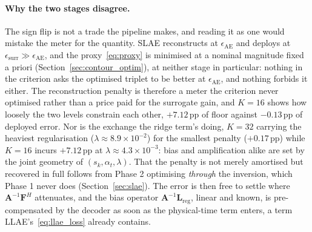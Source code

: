 ﻿\documentclass[a4paper,12pt]{article}
\theoremstyle{definition}
\theoremstyle{remark}
\begin{document}
\paragraph{Why the two stages disagree.}
The sign flip is not a trade the pipeline makes, and reading it as one would mistake the meter for the quantity. SLAE reconstructs at $\epsilon_{\mathrm{AE}}$ and deploys at $\epsilon_{\mathrm{surr}} \gg \epsilon_{\mathrm{AE}}$, and the proxy~\eqref{eq:proxy} is minimised at a nominal magnitude fixed a priori (Section~\ref{sec:contour_optim}), at neither stage in particular: nothing in the criterion asks the optimised triplet to be better at $\epsilon_{\mathrm{AE}}$, and nothing forbids it either. The reconstruction penalty is therefore a meter the criterion never optimised rather than a price paid for the surrogate gain, and $K = 16$ shows how loosely the two levels constrain each other, $+7.12$\,pp of floor against $-0.13$\,pp of deployed error. Nor is the exchange the ridge term's doing, $K=32$ carrying the heaviest regularisation ($\lambda \approx 8.9\times10^{-2}$) for the smallest penalty ($+0.17$\,pp) while $K=16$ incurs $+7.12$\,pp at $\lambda \approx 4.3\times10^{-3}$: bias and amplification alike are set by the joint geometry of $(s_k, \alpha_t, \lambda)$. That the penalty is not merely amortised but recovered in full follows from Phase 2 optimising \emph{through} the inversion, which Phase 1 never does (Section~\ref{sec:slae}). The error is then free to settle where $\bm{A}^{-1}\bm{F}^H$ attenuates, and the bias operator $\bm{A}^{-1}\bm{L}_{\mathrm{reg}}$, linear and known, is pre-compensated by the decoder as soon as the physical-time term enters, a term LLAE's~\eqref{eq:llae_loss} already contains.
\end{document}
